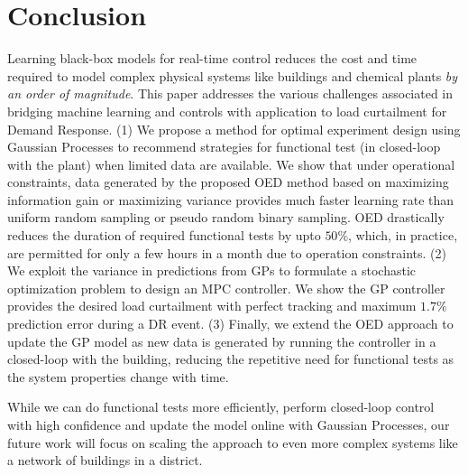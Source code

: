 \section{Conclusion}

Learning black-box models for real-time control reduces the cost and time required to model complex physical systems like buildings and chemical plants \textit{by an order of magnitude}.
This paper addresses the various challenges associated in bridging machine learning and controls with application to load curtailment for Demand Response.
(1) We propose a method for optimal experiment design using Gaussian Processes to recommend strategies for functional test (in closed-loop with the plant) when limited data are available. 
We show that under operational constraints, data generated by the proposed OED method based on maximizing information gain or maximizing variance provides much faster learning rate than uniform random sampling or pseudo random binary sampling. 
OED drastically reduces the duration of required functional tests by upto \(50\%\), which, in practice, are permitted for only a few hours in a month due to operation constraints.
(2) We exploit the variance in predictions from GPs to formulate a stochastic optimization problem to design an MPC controller.
We show the GP controller provides the desired load curtailment with perfect tracking and maximum \(1.7\%\) prediction error during a DR event. 
(3) Finally, we extend the OED approach to update the GP model as new data is generated by running the controller in a closed-loop with the building, reducing the repetitive need for functional tests as the system properties change with time.

While we can do functional tests more efficiently, perform closed-loop control with high confidence and update the model online with Gaussian Processes, our future work will focus on scaling the approach to even more complex systems like a network of buildings in a district.